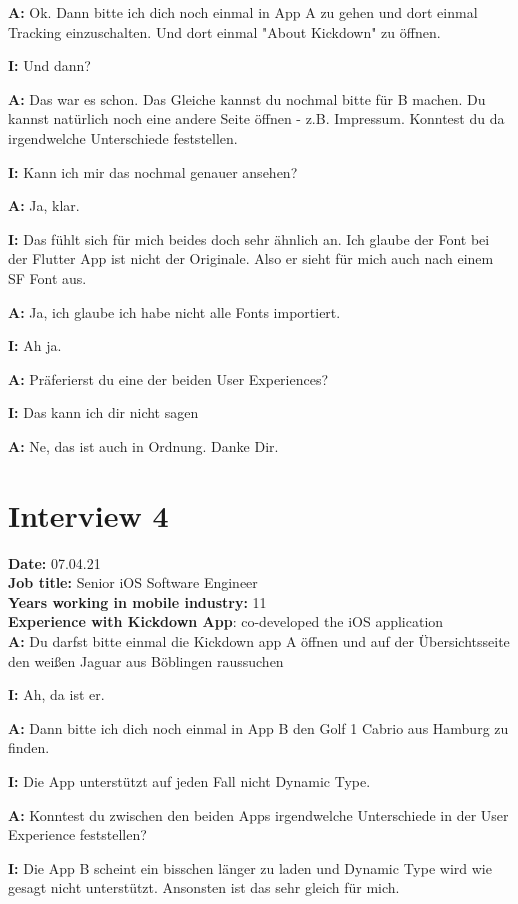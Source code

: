 \begin{myparindent}{0pt}
\textbf{A:} Ok. Dann bitte ich dich noch einmal in App A zu gehen und dort einmal Tracking einzuschalten. Und dort einmal "About Kickdown" zu öffnen. 

\textbf{I:} Und dann?

\textbf{A:} Das war es schon. Das Gleiche kannst du nochmal bitte für B machen. Du kannst natürlich noch eine andere Seite öffnen - z.B. Impressum.
Konntest du da irgendwelche Unterschiede feststellen.

\textbf{I:} Kann ich mir das nochmal genauer ansehen?

\textbf{A:} Ja, klar.

\textbf{I:} Das fühlt sich für mich beides doch sehr ähnlich an. Ich glaube der Font bei der Flutter App ist nicht der Originale. Also er sieht für mich auch nach einem SF Font aus.

\textbf{A:} Ja, ich glaube ich habe nicht alle Fonts importiert.

\textbf{I:} Ah ja. 

\textbf{A:} Präferierst du eine der beiden User Experiences?

\textbf{I:} Das kann ich dir nicht sagen

\textbf{A:} Ne, das ist auch in Ordnung. Danke Dir.

\section{Interview 4}
\textbf{Date:} 07.04.21\\
\textbf{Job title:} Senior iOS Software Engineer\\
\textbf{Years working in mobile industry:} 11\\
\textbf{Experience with Kickdown App}: co-developed the iOS application\\


\textbf{A:} Du darfst bitte einmal die Kickdown app A öffnen und auf der Übersichtsseite den weißen Jaguar aus Böblingen raussuchen

\textbf{I:} Ah, da ist er.

\textbf{A:} Dann bitte ich dich noch einmal in App B den Golf 1 Cabrio aus Hamburg zu finden. 

\textbf{I:} Die App unterstützt auf jeden Fall nicht Dynamic Type. 

\textbf{A:} Konntest du zwischen den beiden Apps irgendwelche Unterschiede in der User Experience feststellen?

\textbf{I:} Die App B scheint ein bisschen länger zu laden und Dynamic Type wird wie gesagt nicht unterstützt. Ansonsten ist das sehr gleich für mich. 


\end{myparindent}
